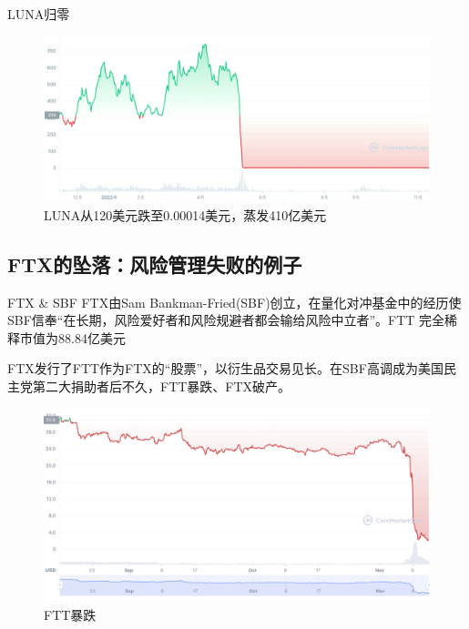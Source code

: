 \begin{frame}{LUNA归零}
    \begin{figure}[H]
        \includegraphics[width=0.6\linewidth]{img/luna.png}
        \caption{LUNA从120美元跌至0.00014美元，蒸发410亿美元}
    \end{figure}
\end{frame}

\subsection{FTX的坠落：风险管理失败的例子}

\begin{frame}{FTX \& SBF}
    FTX由Sam Bankman-Fried(SBF)创立，在量化对冲基金中的经历使SBF信奉“在长期，风险爱好者和风险规避者都会输给风险中立者”。FTT 完全稀释市值为88.84亿美元

    FTX发行了FTT作为FTX的“股票”，以衍生品交易见长。在SBF高调成为美国民主党第二大捐助者后不久，FTT暴跌、FTX破产。
\begin{figure}[H]
    \includegraphics[width=0.7\linewidth]{img/ftt.png}
    \caption{FTT暴跌}
\end{figure}
\end{frame}

